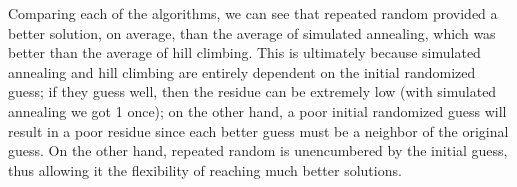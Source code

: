 \documentclass[12pt]{article}
\begin{document}
Comparing each of the algorithms, we can see that repeated random provided a better solution, on average, than the average of simulated annealing, which was better than the average of hill climbing. This is ultimately because simulated annealing and hill climbing are entirely dependent on the initial randomized guess; if they guess well, then the residue can be extremely low (with simulated annealing we got 1 once); on the other hand, a poor initial randomized guess will result in a poor residue since each better guess must be a neighbor of the original guess. On the other hand, repeated random is unencumbered by the initial guess, thus allowing it the flexibility of reaching much better solutions.

\break

\begin{table}[!htbp]
\centering
\caption{Residues of Algorithms}
\label{residues}
\end{table}
\end{document}
